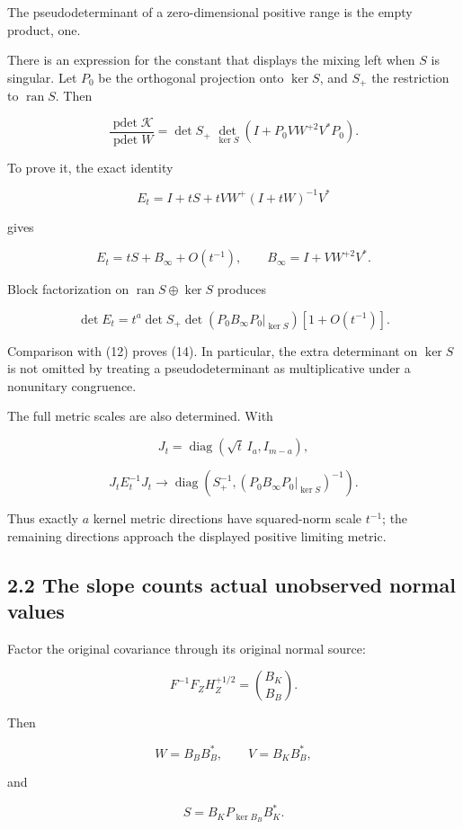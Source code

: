 The pseudodeterminant of a zero-dimensional positive range is the empty product, one.

There is an expression for the constant that displays the mixing left when \(S\) is singular. Let \(P_0\) be the orthogonal projection onto \(\ker S\), and \(S_+\) the restriction to \(\operatorname{ran}S\). Then

\[
\boxed{
\frac{\operatorname{pdet}\mathcal K}{\operatorname{pdet}W}
=
\det S_+\,
\det_{\ker S}\!\left(
I+P_0VW^{+2}V^*P_0
\right).
}
\tag{14}
\]

To prove it, the exact identity

\[
E_t
=
I+tS+tVW^+(I+tW)^{-1}V^*
\]

gives

\[
E_t=tS+B_\infty+O(t^{-1}),
\qquad
B_\infty=I+VW^{+2}V^*.
\]

Block factorization on \(\operatorname{ran}S\oplus\ker S\) produces

\[
\det E_t
=
t^a\det S_+\det(P_0B_\infty P_0|_{\ker S})
[1+O(t^{-1})].
\]

Comparison with (12) proves (14). In particular, the extra determinant on \(\ker S\) is not omitted by treating a pseudodeterminant as multiplicative under a nonunitary congruence.

The full metric scales are also determined. With

\[
J_t=\operatorname{diag}(\sqrt t\,I_a,I_{m-a}),
\]

\[
\boxed{
J_tE_t^{-1}J_t
\longrightarrow
\operatorname{diag}
\left(S_+^{-1},
(P_0B_\infty P_0|_{\ker S})^{-1}\right).
}
\tag{15}
\]

Thus exactly \(a\) kernel metric directions have squared-norm scale \(t^{-1}\); the remaining directions approach the displayed positive limiting metric.

\subsection{2.2 The slope counts actual unobserved normal values}\label{the-slope-counts-actual-unobserved-normal-values}

Factor the original covariance through its original normal source:

\[
F^{-1}F_ZH_Z^{+1/2}
=
\binom{B_K}{B_B}.
\]

Then

\[
W=B_BB_B^*,\qquad
V=B_KB_B^*,
\]

and

\[
\boxed{
S=B_KP_{\ker B_B}B_K^*.
}
\tag{16}
\]

